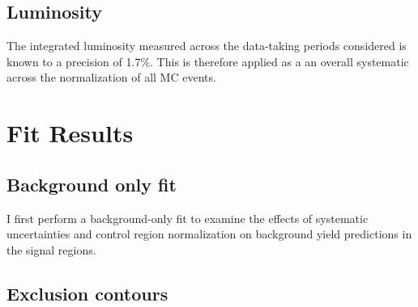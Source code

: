 \subsection{Luminosity}
The integrated luminosity measured across the data-taking periods considered is known to a precision of 1.7\%. This is therefore applied as a an overall systematic across the normalization of all MC events.

\section{Fit Results}
\subsection{Background only fit}
I first perform a background-only fit to examine the effects of systematic uncertainties and control region normalization on background yield predictions in the signal regions.
\subsection{Exclusion contours}
